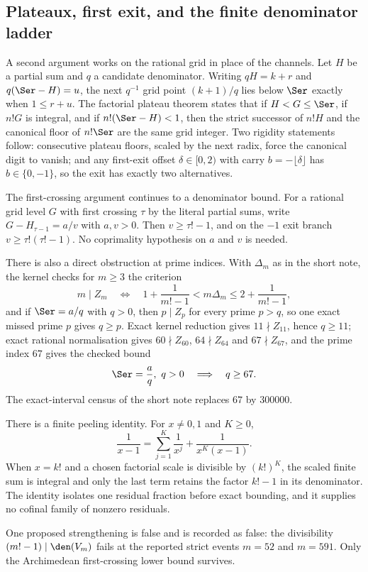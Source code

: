 \subsection{Plateaux, first exit, and the finite denominator ladder}
\label{long68:sec:ext-plateau}

A second argument works on the rational grid in place of the channels.  Let
$H$ be a partial sum and $q$ a candidate denominator.  Writing $qH=k+r$ and
$q(\Ser-H)=u$, the next $q^{-1}$ grid point $(k+1)/q$ lies below $\Ser$
exactly when $1\le r+u$.  The factorial plateau theorem states that if
$H<G\le\Ser$, if $n!G$ is integral, and if $n!(\Ser-H)<1$, then the strict
successor of $n!H$ and the canonical floor of $n!\Ser$ are the same grid
integer.  Two rigidity statements follow: consecutive plateau floors, scaled
by the next radix, force the canonical digit to vanish; and any first-exit
offset $\delta\in[0,2)$ with carry $b=-\lfloor\delta\rfloor$ has
$b\in\{0,-1\}$, so the exit has exactly two alternatives.

The first-crossing argument continues to a denominator bound.  For a rational
grid level $G$ with first crossing $\tau$ by the literal partial sums, write
$G-H_{\tau-1}=a/v$ with $a,v>0$.  Then $v\ge\tau!-1$, and on the $-1$ exit
branch $v\ge\tau!(\tau!-1)$.  No coprimality hypothesis on $a$ and $v$ is
needed.

There is also a direct obstruction at prime indices.  With $\Delta_m$ as in
the short note, the kernel checks for $m\ge3$ the criterion
\[
 m\mid Z_m
 \quad\Longleftrightarrow\quad
 1+\frac1{m!-1}<m\Delta_m\le2+\frac1{m!-1},
\]
and if $\Ser=a/q$ with $q>0$, then $p\mid Z_p$ for every prime $p>q$, so one
exact missed prime $p$ gives $q\ge p$.  Exact kernel reduction gives
$11\nmid Z_{11}$, hence $q\ge11$; exact rational normalisation gives
$60\nmid Z_{60}$, $64\nmid Z_{64}$ and $67\nmid Z_{67}$, and the prime index
$67$ gives the checked bound
\[
 \Ser=\frac aq,\ q>0\quad\Longrightarrow\quad q\ge67 .
\]
The exact-interval census of the short note replaces $67$ by $300000$.

There is a finite peeling identity.  For $x\ne0,1$ and $K\ge0$,
\[
 \frac1{x-1}=\sum_{j=1}^{K}\frac1{x^j}+\frac1{x^K(x-1)} .
\]
When $x=k!$ and a chosen factorial scale is divisible by $(k!)^K$, the scaled
finite sum is integral and only the last term retains the factor $k!-1$ in
its denominator.  The identity isolates one residual fraction before exact
bounding, and it supplies no cofinal family of nonzero residuals.

One proposed strengthening is false and is recorded as false: the
divisibility $(m!-1)\mid\den(V_m)$ fails at the reported strict events
$m=52$ and $m=591$.  Only the Archimedean first-crossing lower bound
survives.

